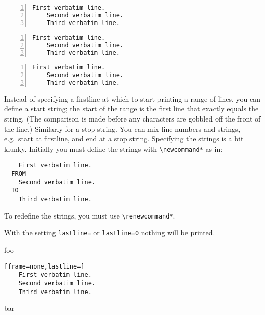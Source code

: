 \documentclass[twoside]{article}
\newcommand\cs[1]{\texttt{\textbackslash#1}}
\begin{document}
\begin{SideBySideExample}
  \begin{Verbatim}[gobble=2,firstline,lastline,
         numbers=left,numbersep=2pt]
    First verbatim line.
    Second verbatim line.
    Third verbatim line.
  \end{Verbatim}
\end{SideBySideExample}



\begin{SideBySideExample}
  \begin{Verbatim}[gobble=2,firstline=2,
         numbers=left,numbersep=2pt]
    First verbatim line.
    Second verbatim line.
    Third verbatim line.
  \end{Verbatim}
\end{SideBySideExample}


\begin{SideBySideExample}
  \begin{Verbatim}[gobble=2,lastline=1,
         numbers=left,numbersep=2pt]
    First verbatim line.
    Second verbatim line.
    Third verbatim line.
  \end{Verbatim}
\end{SideBySideExample}

Instead of specifying a firstline at which to start printing a range
of lines, you can define a start string; the start of the range is
the first line that exactly equals the string.  (The comparison is made
before any characters are gobbled off the front of the line.) Similarly for a stop
string. You can mix line-numbers and strings, e.g.\ start at
firstline, and end at a stop string.  Specifying the strings is a
bit klunky.  Initially you must define the strings with
\cs{newcommand*} as in:

\begin{SideBySideExample}[gobble=2]
  \newcommand*\FancyVerbStartString{FROM}
  \newcommand*\FancyVerbStopString{TO}
  \begin{Verbatim}
    First verbatim line.
  FROM
    Second verbatim line.
  TO
    Third verbatim line.
  \end{Verbatim}
\end{SideBySideExample}

\noindent To redefine the strings, you must use \cs{renewcommand*}.

With the setting \texttt{lastline=} or \texttt{lastline=0} nothing will be printed.

\begin{SideBySideExample}[gobble=2]
  foo
  \begin{Verbatim}[frame=none,lastline=]
    First verbatim line.
    Second verbatim line.
    Third verbatim line.
  \end{Verbatim}
  bar
\end{SideBySideExample}
\end{document}
